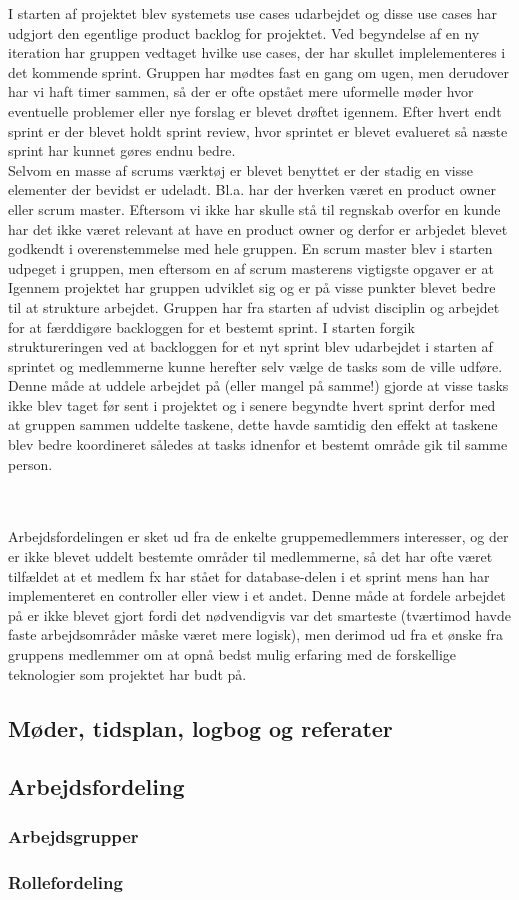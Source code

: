 I starten af projektet blev systemets use cases udarbejdet og disse use cases har udgjort den egentlige product backlog for projektet. Ved begyndelse af en ny iteration har gruppen vedtaget hvilke use cases, der har skullet implelementeres i det kommende sprint. Gruppen har mødtes fast en gang om ugen, men derudover har vi haft timer sammen, så der er ofte opstået mere uformelle møder hvor eventuelle problemer eller nye forslag er blevet drøftet igennem. Efter hvert endt sprint er der blevet holdt sprint review, hvor sprintet er blevet evalueret så næste sprint har kunnet gøres endnu bedre.   \\
Selvom en masse af scrums værktøj er blevet benyttet er der stadig en visse elementer der bevidst er udeladt. Bl.a. har der hverken været en product owner eller scrum master.  Eftersom vi ikke har skulle stå til regnskab overfor en kunde har det ikke været relevant at have en product owner og derfor er arbjedet blevet godkendt i overenstemmelse med hele gruppen. En scrum master blev i starten udpeget i gruppen, men eftersom en af scrum masterens vigtigste opgaver er at 
\\
Igennem projektet har gruppen udviklet sig og er på visse punkter blevet bedre til at strukture arbejdet. Gruppen har fra starten af udvist disciplin og arbejdet for at færddigøre backloggen for et bestemt sprint. I starten forgik struktureringen ved at backloggen for et nyt sprint blev udarbejdet i starten af sprintet og medlemmerne kunne herefter selv vælge de tasks som de ville udføre. Denne måde at uddele arbejdet på (eller mangel på samme!) gjorde at visse tasks ikke blev taget før sent i projektet og i senere begyndte hvert sprint derfor med at gruppen sammen uddelte taskene, dette havde samtidig den effekt at taskene blev bedre koordineret således at tasks idnenfor et bestemt område gik til samme person. 

\\
\\
Arbejdsfordelingen er sket ud fra de enkelte gruppemedlemmers interesser, og der er ikke blevet uddelt bestemte områder til medlemmerne, så det har ofte været tilfældet at et medlem fx har stået for database-delen i et sprint mens han har implementeret en controller eller view i et andet. Denne måde at fordele arbejdet på er ikke blevet gjort fordi det nødvendigvis var det smarteste (tværtimod havde faste arbejdsområder måske været mere logisk), men derimod ud fra et ønske fra gruppens medlemmer om at opnå bedst mulig erfaring med de forskellige teknologier som projektet har budt på.


\subsection{Møder, tidsplan, logbog og referater}

\subsection{Arbejdsfordeling}

\subsubsection{Arbejdsgrupper}

\subsubsection{Rollefordeling}
